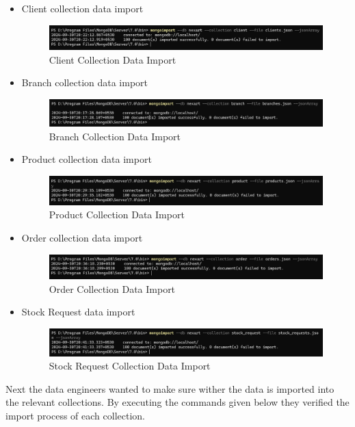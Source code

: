 \documentclass[a4Paper,12pt]{report}
\begin{document}
\begin{itemize}
\item Client collection data import
\begin{figure}[H]
\centering
\includegraphics[scale=0.5]{images/client_data_import.png}
\caption{Client Collection Data Import}
\end{figure}
\item Branch collection data import
\begin{figure}[H]
\centering
\includegraphics[scale=0.5]{images/branch_data_import.png}
\caption{Branch Collection Data Import}
\end{figure}
\item Product collection data import
\begin{figure}[H]
\centering
\includegraphics[scale=0.5]{images/product_data_import.png}
\caption{Product Collection Data Import}
\end{figure}
\item Order collection data import
\begin{figure}[H]
\centering
\includegraphics[scale=0.5]{images/order_data_import.png}
\caption{Order Collection Data Import}
\end{figure}
\item Stock Request data import
\begin{figure}[H]
\centering
\includegraphics[scale=0.5]{images/stock_request_data_import.png}
\caption{Stock Request Collection Data Import}
\end{figure}
\end{itemize}
Next the data engineers wanted to make sure wither the data is imported into the relevant collections. By executing the commands given below they verified the import process of each collection.
\end{document}
